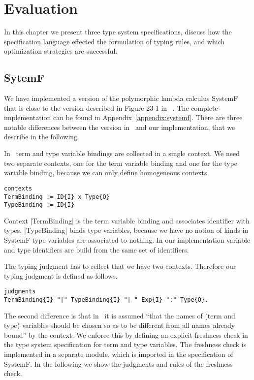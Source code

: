 \chapter{Evaluation}
\label{cha:evaluation}
In this chapter we present three type system specifications, discuss
how the specification language effected the formulation of typing
rules, and which optimization strategies are successful.
\section{SytemF}
\label{sec:sytemf}
We have implemented a version of the polymorphic lambda calculus
SystemF that is close to the version described in Figure 23-1 in
~\cite{Pierce:2002:TPL:509043}. The complete implementation can be
found in Appendix~\ref{appendix:systemf}. There are three notable
differences between the version in~\cite{Pierce:2002:TPL:509043} and
our implementation, that we describe in the following.

In~\cite{Pierce:2002:TPL:509043} term and type variable bindings are
collected in a single context. We need two separate contexts, one for
the term variable binding and one for the type variable binding,
because we can only define homogeneous contexts.

\begin{lstlisting}[language=sltc]
contexts
TermBinding := ID{I} x Type{O}
TypeBinding := ID{I}
\end{lstlisting}

Context \code|TermBinding| is the term variable binding and associates
identifier with types. \code|TypeBinding| binds type variables,
because we have no notion of kinds in SystemF type variables are
associated to nothing. In our implementation variable and type
identifiers are build from the same set of identifiers.

The typing judgment has to reflect that we have two
contexts. Therefore our typing judgment is defined as follows.

\begin{lstlisting}[language=sltc]
judgments
TermBinding{I} "|" TypeBinding{I} "|-" Exp{I} ":" Type{O}.
\end{lstlisting}

The second difference is that in~\cite{Pierce:2002:TPL:509043} it is
assumed ``that the names of (term and type) variables should be chosen
so as to be different from all names already bound'' by the
context. We enforce this by defining an explicit freshness check in
the type system specification for term and type variables. The
freshness check is implemented in a separate module, which is imported
in the specification of SystemF. In the following we show the
judgments and rules of the freshness check.

